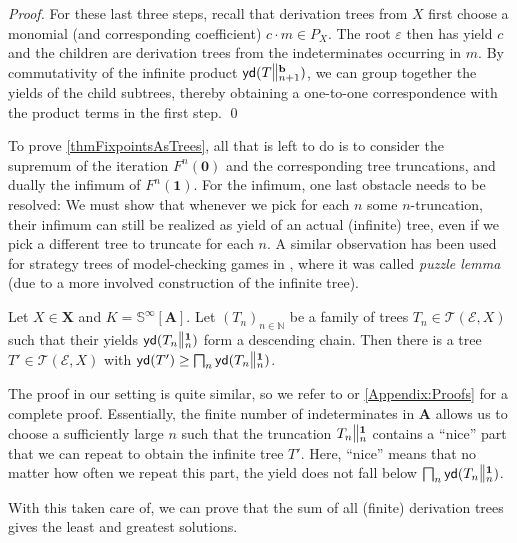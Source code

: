 \documentclass[english,runningheads,a4paper,envcountsame]{llncs}
\newcommand{\Inf}{\bigsqcap}
\newcommand{\Nat}{\mathbb{N}}
\newcommand{\Sinf}{{\mathbb S}^{\infty}}
\newcommand*{\XX}{{\bm X}}
\newcommand*{\EE}{\mathcal{E}}
\renewcommand{\AA}{{\bm A}}
\renewcommand*{\root}{\varepsilon}
\newcommand*{\yield}{\mathsf{yd}}
\newcommand*{\Trees}{\mathcal{T}}
\newcommand{\cut}[2]{\scalebox{1}[1.3]{$\|$}\vphantom{|}_{#1}^{#2}}
\newcommand{\bb}{\tup b}
\newcommand{\one}{\tup 1}
\newcommand*{\tup}[1]{\mathbf{#1}}
\begin{document}
\begin{proof}
For these last three steps, recall that derivation trees from $X$ first choose a monomial (and corresponding coefficient) $c \cdot m \in P_X$.
The root $\root$ then has yield $c$ and the children are derivation trees from the indeterminates occurring in $m$.
By commutativity of the infinite product $\yield(T \cut {n+1} \bb)$,
we can group together the yields of the child subtrees,
thereby obtaining a one-to-one correspondence with the product terms in the first step. \qed
\end{proof}


To prove \cref{thmFixpointsAsTrees}, all that is left to do is to consider the supremum of the iteration $F^n(\tup 0)$ and the corresponding tree truncations, and dually the infimum of $F^n(\tup 1)$.
For the infimum, one last obstacle needs to be resolved:
We must show that whenever we pick for each $n$ some $n$-truncation, their infimum can still be realized as yield of an actual (infinite) tree, even if we pick a different tree to truncate for each $n$.
A similar observation has been used for strategy trees of model-checking games in \cite{DannertGraNaaTan21}, where it was called \emph{puzzle lemma} (due to a more involved construction of the infinite tree).

\begin{lemma}
\label{lemTreesPuzzle}
Let $X \in \XX$ and $K=\Sinf[\AA]$.
Let $(T_n)_{n \in \Nat}$ be a family of trees $T_n \in \Trees(\EE,X)$
such that their yields $\yield(T_n \cut n \one)$ form a descending chain.
Then there is a tree $T' \in \Trees(\EE,X)$ with $\yield(T') \ge \Inf_n \yield(T_n \cut n \one)$.
\end{lemma}

The proof in our setting is quite similar, so we refer to \cite{DannertGraNaaTan21} or \cref{Appendix:Proofs} for a complete proof.
Essentially, the finite number of indeterminates in $\AA$ allows us to choose a sufficiently large $n$ such that the truncation $T_n \cut n \one$ contains a \enquote{nice} part that we can repeat to obtain the infinite tree $T'$.
Here, \enquote{nice} means that no matter how often we repeat this part, the yield does not fall below $\Inf_n \yield(T_n \cut n \one)$.

With this taken care of, we can prove that the sum of all (finite) derivation trees gives the least and greatest solutions.
\end{document}
